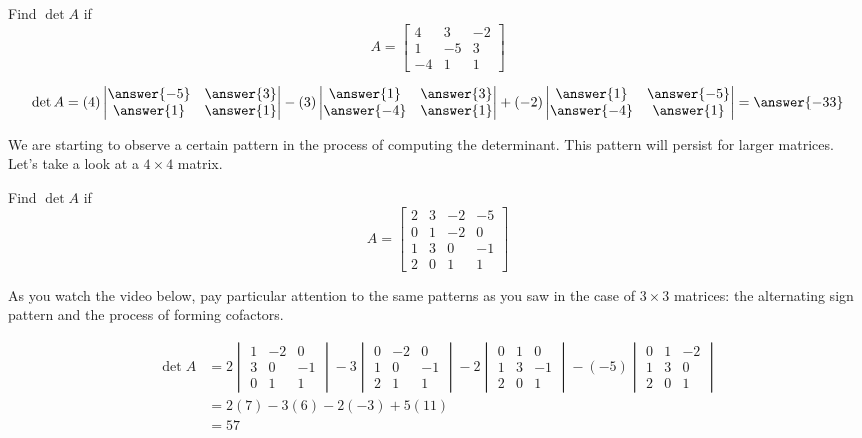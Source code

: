 \documentclass{ximera}
\begin{document}
\begin{example}\label{ex:3x3det2}
Find $\det{A}$ if 
$$A=\begin{bmatrix}4&3&-2\\1&-5&3\\-4&1&1\end{bmatrix}$$
\begin{explanation}
$$
\det{A}=(4)\begin{vmatrix}\answer{-5}&\answer{3}\\\answer{1}&\answer{1}\end{vmatrix}-(3)\begin{vmatrix}\answer{1}&\answer{3}\\\answer{-4}&\answer{1}\end{vmatrix}+(-2)\begin{vmatrix}\answer{1}&\answer{-5}\\\answer{-4}&\answer{1}\end{vmatrix}
=\answer{-33}
$$
\end{explanation}
\end{example}

We are starting to observe a certain pattern in the process of computing the determinant.  This pattern will persist for larger matrices.  Let's take a look at a $4\times 4$ matrix.

\begin{example}\label{ex:4by4withVideo}
    Find $\det{A}$ if 
    $$A=\begin{bmatrix} 2 & 3 & -2 & -5\\0 & 1& -2& 0\\1& 3 & 0 &-1\\2&0& 1&1\end{bmatrix}$$

\begin{explanation}
As you watch the video below, pay particular attention to the same patterns as you saw in the case of $3\times 3$ matrices: the alternating sign pattern and the process of forming cofactors.

\begin{align*}
\det{A}
&=2\begin{vmatrix}1& -2& 0\\3 & 0 &-1\\0& 1&1\end{vmatrix}-3\begin{vmatrix}0 & -2& 0\\1 & 0 &-1\\2& 1&1\end{vmatrix}-2\begin{vmatrix}0 & 1& 0\\1& 3 &-1\\2&0&1\end{vmatrix}-(-5)\begin{vmatrix}0 & 1& -2\\1& 3 & 0 \\2&0& 1\end{vmatrix}\\
&=2(7)-3(6)-2(-3)+5(11)\\
&=57
\end{align*}

\end{explanation}
\end{example}
\end{document}
